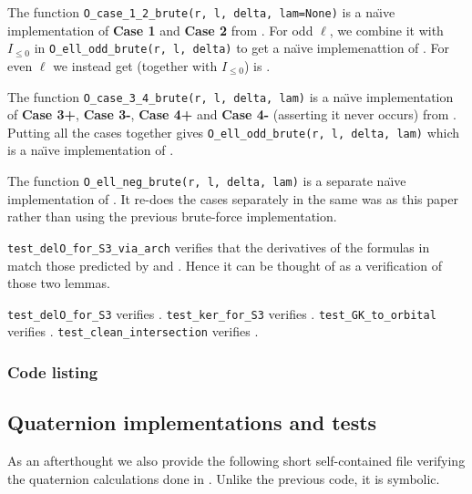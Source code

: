 \begin{enumerate}
\begin{itemize}
      \ii The function \texttt{O\_case\_1\_2\_brute(r, l, delta, lam=None)}
      is a na\"{\i}ve implementation of \textbf{Case 1} and \textbf{Case 2}
      from .
      For odd $\ell$, we combine it with $I_{\le 0}$ in \texttt{O\_ell\_odd\_brute(r, l, delta)}
      to get a na\"{\i}ve implemenattion of .
      For even $\ell$ we instead get (together with $I_{\le 0}$) is .

      \ii The function \texttt{O\_case\_3\_4\_brute(r, l, delta, lam)}
      is a na\"{\i}ve implementation of
      \textbf{Case 3\ts+}, \textbf{Case 3\ts-}, \textbf{Case 4\ts+}
      and \textbf{Case 4\ts-} (asserting it never occurs)
      from .
      Putting all the cases together gives
      \texttt{O\_ell\_odd\_brute(r, l, delta, lam)}
      which is a na\"{\i}ve implementation of .

      \ii The function \texttt{O\_ell\_neg\_brute(r, l, delta, lam)}
      is a separate na\"{\i}ve implementation of .
      It re-does the cases separately in the same was as this paper
      rather than using the previous brute-force implementation.
    \end{itemize}

  \ii \texttt{test\_delO\_for\_S3\_via\_arch} verifies that the derivatives of the formulas in
  match those predicted by  and .
  Hence it can be thought of as a verification of those two lemmas.

  \ii \texttt{test\_delO\_for\_S3} verifies .
  \ii \texttt{test\_ker\_for\_S3} verifies .
  \ii \texttt{test\_GK\_to\_orbital} verifies .
  \ii \texttt{test\_clean\_intersection} verifies .
\end{enumerate}

\subsubsection{Code listing}

\singlespacing

\doublespacing

\subsection{Quaternion implementations and tests}
As an afterthought we also provide the following short self-contained file
verifying the quaternion calculations done in .
Unlike the previous code, it is symbolic.

\singlespacing

\doublespacing
